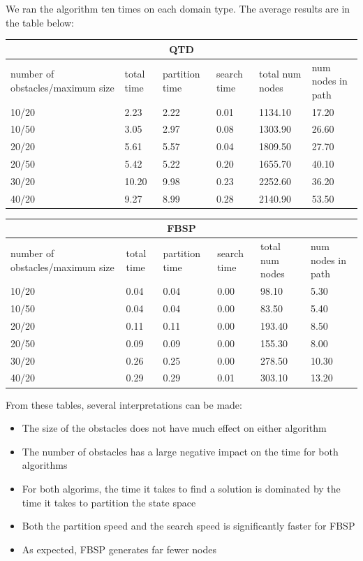 \documentclass[12pt,a4paper]{article}
\begin{document}
We ran the algorithm ten times on each domain type. The average results are in the table below:\\
\begin{center}
\begin{tabular}{ |p{2cm}||p{2cm}|p{2cm}|p{2cm}| p{2cm} | p{2cm} | }


 \hline
 \multicolumn{6}{|c|}{QTD} \\
 \hline
 number of obstacles/maximum size & total time & partition time & search time & total num nodes & num nodes in path\\
 \hline
 10/20 & 2.23   & 2.22  & 0.01  & 1134.10 & 17.20\\
 10/50 & 3.05   & 2.97  & 0.08  & 1303.90 & 26.60\\
 20/20 & 5.61   & 5.57  & 0.04  & 1809.50 & 27.70\\
 20/50 & 5.42   & 5.22  & 0.20   & 1655.70 & 40.10\\
 30/20 & 10.20   & 9.98 & 0.23  & 2252.60 & 36.20\\
 40/20 & 9.27  & 8.99 & 0.28 & 2140.90 & 53.50\\
 \hline
\end{tabular}
\end{center}

\begin{center}
\begin{tabular}{ |p{2cm}||p{2cm}|p{2cm}|p{2cm}| p{2cm} | p{2cm} | }

 \hline
 \multicolumn{6}{|c|}{FBSP} \\
 \hline
 number of obstacles/maximum size & total time & partition time & search time & total num nodes & num nodes in path\\
 \hline
 10/20 & 0.04   & 0.04  & 0.00  & 98.10 & 5.30\\
 10/50 & 0.04   & 0.04  & 0.00  & 83.50 & 5.40\\
 20/20 & 0.11   & 0.11  & 0.00  & 193.40 & 8.50\\
 20/50 & 0.09   & 0.09  & 0.00   & 155.30 & 8.00\\
 30/20 & 0.26   & 0.25 & 0.00  & 278.50 & 10.30\\
 40/20 & 0.29  & 0.29 & 0.01 & 303.10 & 13.20\\
 \hline
\end{tabular}
\end{center}

From these tables, several interpretations can
be made:
\begin{itemize}
\item
The size of the obstacles does not have much effect on 
either algorithm
\item
The number of obstacles has a large negative impact on 
the time for both algorithms
\item
For both algorims, the time it takes to find a solution is dominated by the time it takes to partition the state space
\item
Both the partition speed and the search speed is significantly faster for FBSP
\item
As expected, FBSP generates far fewer nodes

\end{itemize}
\end{document}
